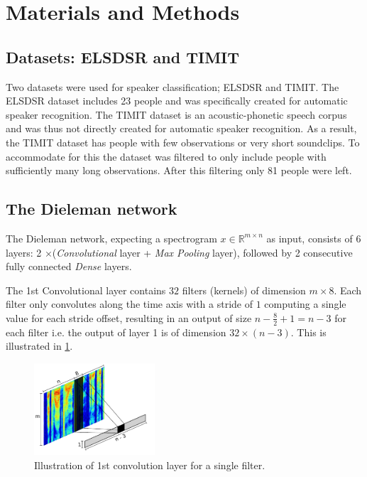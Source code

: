 \section{Materials and Methods}

\subsection{Datasets: ELSDSR and TIMIT}

Two datasets were used for speaker classification; ELSDSR and TIMIT. The ELSDSR dataset includes 23 people and was specifically created for automatic speaker recognition. The TIMIT dataset is an acoustic-phonetic speech corpus and was thus not directly created for automatic speaker recognition. As a result, the TIMIT dataset has people with few observations or very short soundclips. To accommodate for this the dataset was filtered to only include people with sufficiently many long observations. After this filtering only 81 people were left.

\subsection{The Dieleman network}

The Dieleman network, expecting a spectrogram $x \in \mathbb{R}^{m \times n}$ as input, consists of 6 layers: 2 $\times$(\emph{Convolutional} layer + \emph{Max Pooling} layer), followed by 2 consecutive fully connected \emph{Dense} layers.

The 1st Convolutional layer contains $32$ filters (kernels) of dimension $m \times 8$. Each filter only convolutes along the time axis with a stride of $1$ computing a single value for each stride offset, resulting in an output of size $n - \frac{8}{2} + 1 = n - 3$ for each filter i.e. the output of layer 1 is of dimension $32 \times (n-3)$. This is illustrated in \cref{fig:convolution-1}.

\begin{figure}[H]
  \centering
  \includegraphics[width=0.4\textwidth]{inkscape/convolution.pdf}
  \caption{Illustration of 1st convolution layer for a single filter.}
  \label{fig:convolution-1}
\end{figure}

